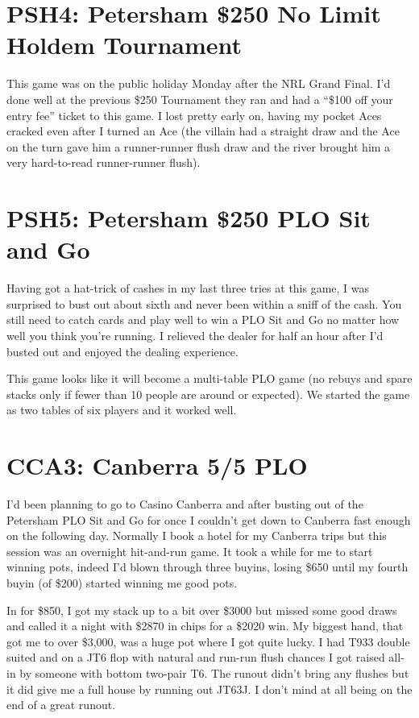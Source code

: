 \section*{PSH4: Petersham \$250 No Limit Holdem Tournament}

This game was on the public holiday Monday after the NRL Grand
Final. I'd done well at the previous \$250 Tournament they ran and had
a ``\$100 off your entry fee'' ticket to this game. I lost pretty
early on, having my pocket Aces cracked even after I turned an Ace
(the villain had a straight draw and the Ace on the turn gave him a
runner-runner flush draw and the river brought him a very hard-to-read
runner-runner flush).

\section*{PSH5: Petersham \$250 PLO Sit and Go}

Having got a hat-trick of cashes in my last three tries at this game,
I was surprised to bust out about sixth and never been within a sniff
of the cash. You still need to catch cards and play well to win a PLO
Sit and Go no matter how well you think you're running. I relieved the
dealer for half an hour after I'd busted out and enjoyed the dealing
experience.

This game looks like it will become a multi-table PLO game (no rebuys
and spare stacks only if fewer than 10 people are around or
expected). We started the game as two tables of six players and it
worked well.

\section*{CCA3: Canberra 5/5 PLO}

I'd been planning to go to Casino Canberra and after busting out of
the Petersham PLO Sit and Go for once I couldn't get down to Canberra
fast enough on the following day. Normally I book a hotel for my
Canberra trips but this session was an overnight hit-and-run game. It
took a while for me to start winning pots, indeed I'd blown through
three buyins, losing \$650 until my fourth buyin (of \$200) started
winning me good pots.

In for \$850, I got my stack up to a bit over \$3000 but missed some
good draws and called it a night with \$2870 in chips for a \$2020
win. My biggest hand, that got me to over \$3,000, was a huge pot
where I got quite lucky. I had T933 double suited and on a JT6 flop
with natural and run-run flush chances I got raised all-in by someone
with bottom two-pair T6. The runout didn't bring any flushes but it
did give me a full house by running out JT63J. I don't mind at all
being on the end of a great runout.

